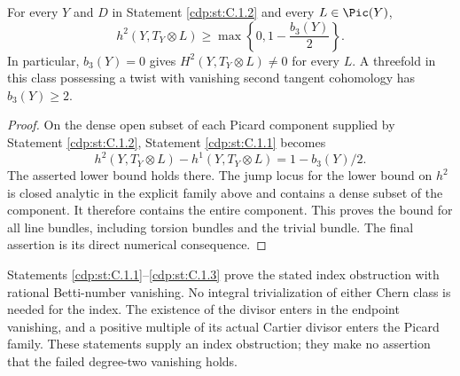 
\begin{proposition}\label{cdp:st:C.1.3}
For every $Y$ and $D$ in Statement \ref{cdp:st:C.1.2} and every $L\in\Pic(Y)$,
\[
 h^2(Y,T_Y\otimes L)\geq
 \max\left\{0,1-\frac{b_3(Y)}2\right\}.
\]
In particular, $b_3(Y)=0$ gives $H^2(Y,T_Y\otimes L)\ne0$ for
every $L$. A threefold in this class possessing a twist with vanishing
second tangent cohomology has $b_3(Y)\geq2$.
\end{proposition}
\begin{proof}
On the dense open subset of each Picard component supplied by
Statement \ref{cdp:st:C.1.2}, Statement \ref{cdp:st:C.1.1} becomes
\[
 h^2(Y,T_Y\otimes L)-h^1(Y,T_Y\otimes L)
 =1-b_3(Y)/2.
\]
The asserted lower bound holds there. The jump locus for the lower
bound on $h^2$ is closed analytic in the explicit family above and
contains a dense subset of the component. It therefore contains the
entire component. This proves the bound for all line bundles,
including torsion bundles and the trivial bundle. The final assertion
is its direct numerical consequence.
\end{proof}

Statements \ref{cdp:st:C.1.1}--\ref{cdp:st:C.1.3} prove the stated index obstruction with rational Betti-number
vanishing. No integral trivialization of either Chern class is needed
for the index. The existence of the divisor enters in the endpoint
vanishing, and a positive multiple of its actual Cartier divisor
enters the Picard family. These statements supply an index
obstruction; they make no assertion that the failed degree-two
vanishing holds.



